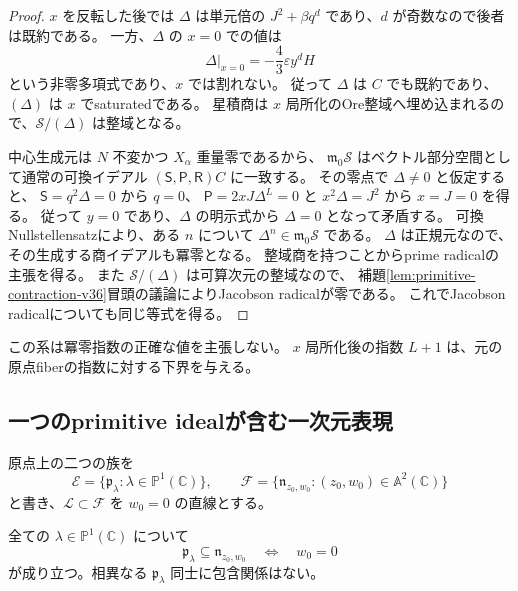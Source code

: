 \begin{proof}
$x$ を反転した後では $\Delta$ は単元倍の
$J^2+\beta q^d$ であり、$d$ が奇数なので後者は既約である。
一方、$\Delta$ の $x=0$ での値は
\[
 \Delta\big|_{x=0}=-\frac43\varepsilon y^dH
\]
という非零多項式であり、$x$ では割れない。
従って $\Delta$ は $C$ でも既約であり、$(\Delta)$ は $x$ でsaturatedである。
星積商は $x$ 局所化のOre整域へ埋め込まれるので、$\mathcal S/(\Delta)$ は整域となる。

中心生成元は $N$ 不変かつ $X_\alpha$ 重量零であるから、
$\mathfrak m_0\mathcal S$ はベクトル部分空間として通常の可換イデアル
$(\mathsf S,\mathsf P,\mathsf R)C$ に一致する。
その零点で $\Delta\ne0$ と仮定すると、
$\mathsf S=q^2\Delta=0$ から $q=0$、
$\mathsf P=2xJ\Delta^L=0$ と $x^2\Delta=J^2$ から $x=J=0$ を得る。
従って $y=0$ であり、$\Delta$ の明示式から $\Delta=0$ となって矛盾する。
可換Nullstellensatzにより、ある $n$ について
$\Delta^n\in\mathfrak m_0\mathcal S$ である。
$\Delta$ は正規元なので、その生成する商イデアルも冪零となる。
整域商を持つことからprime radicalの主張を得る。
また $\mathcal S/(\Delta)$ は可算次元の整域なので、
補題\ref{lem:primitive-contraction-v36}冒頭の議論によりJacobson radicalが零である。
これでJacobson radicalについても同じ等式を得る。
\end{proof}

この系は冪零指数の正確な値を主張しない。
$x$ 局所化後の指数 $L+1$ は、元の原点fiberの指数に対する下界を与える。

\subsection{一つのprimitive idealが含む一次元表現}

原点上の二つの族を
\[
 \mathscr E=\{\mathfrak p_\lambda:\lambda\in\mathbb P^1(\mathbb C)\},\qquad
 \mathscr F=\{\mathfrak n_{z_0,w_0}:(z_0,w_0)\in\mathbb A^2(\mathbb C)\}
\]
と書き、$\mathscr L\subset\mathscr F$ を $w_0=0$ の直線とする。

\begin{lemma}[境界に現れる直線]
\label{lem:primitive-boundary-v36}
全ての $\lambda\in\mathbb P^1(\mathbb C)$ について
\[
 \mathfrak p_\lambda\subseteq\mathfrak n_{z_0,w_0}
 \quad\Longleftrightarrow\quad w_0=0
\]
が成り立つ。相異なる $\mathfrak p_\lambda$ 同士に包含関係はない。
\end{lemma}

